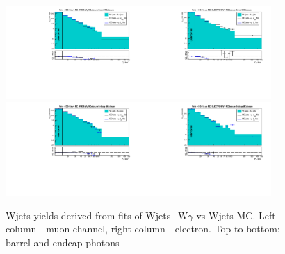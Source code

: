  \begin{figure}[htb]
  \begin{center}
   \includegraphics[width=0.45\textwidth]{../figs/figs_v11/MUON_WGamma/MCclosureWjetsPlusWg/c_FakeDDvsMC_c_MUON_WGamma__UNblind_MCclosure__Barrel__phoEt_MCclosure.pdf}\includegraphics[width=0.45\textwidth]{../figs/figs_v11/ELECTRON_WGamma/MCclosureWjetsPlusWg/c_FakeDDvsMC_c_ELECTRON_WGamma__UNblind_MCclosure__Barrel__phoEt_MCclosure.pdf}
   \includegraphics[width=0.45\textwidth]{../figs/figs_v11/MUON_WGamma/MCclosureWjetsPlusWg/c_FakeDDvsMC_c_MUON_WGamma__UNblind_MCclosure__Endcap__phoEt_MCclosure.pdf}\includegraphics[width=0.45\textwidth]{../figs/figs_v11/ELECTRON_WGamma/MCclosureWjetsPlusWg/c_FakeDDvsMC_c_ELECTRON_WGamma__UNblind_MCclosure__Endcap__phoEt_MCclosure.pdf}
  \caption{Wjets yields derived from fits of Wjets+W$\gamma$ vs Wjets MC. Left column - muon channel, right column - electron. Top to bottom: barrel and endcap photons}
  \label{fig:FakeDDvsMC_MCclosureWjetsPlusWg}
  \end{center}
\end{figure}

